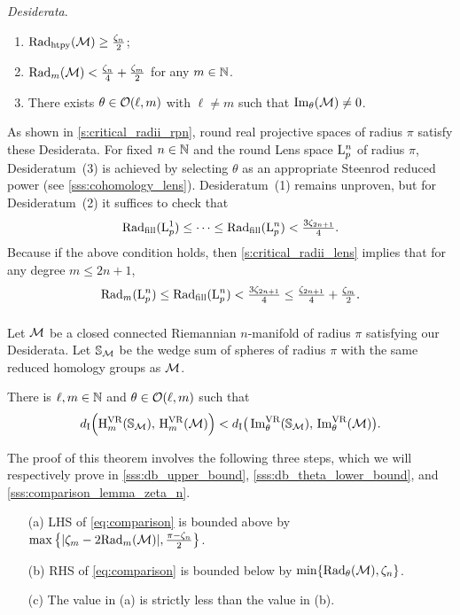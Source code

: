 \medskip\noindent\textit{\darkblue Desiderata}.\
\begin{enumerate}
    \item $\mathrm{Rad}_{\mathrm{htpy}}(\mathcal{M}) \geq \tfrac{\zeta_n}{2} $;
    \item $\mathrm{Rad}_{m}(\mathcal{M}) < \tfrac{\zeta_n}{4}+\tfrac{\zeta_m}{2}$ for any $m \in \mathbb{N}$.
    \item There exists $\theta \in \mathcal{O}(\ell, m)$ with \(\ell \neq m\) such that $\operatorname{Im}_\theta(\mathcal{M}) \neq 0$.
\end{enumerate}

\medskip As shown in \cref{s:critical_radii_rpn}, round real projective spaces of radius \(\pi\) satisfy these Desiderata.
For fixed $n\in \mathbb{N}$ and the round Lens space $\mathrm{L}^n_p$ of radius \(\pi\), Desideratum~(3) is achieved by selecting $\theta$ as an appropriate Steenrod reduced power (see \cref{sss:cohomology_lens}).
Desideratum~(1) remains unproven, but for Desideratum~(2) it suffices to check that
\[
\mathrm{Rad}_{\mathrm{fill}}(\mathrm{L}^1_p) \leq \dotsb \leq \mathrm{Rad}_{\mathrm{fill}}(\mathrm{L}^n_p) < \tfrac{3\zeta_{2n+1}}{4}.
\]
Because if the above condition holds, then \cref{s:critical_radii_lens} implies that for any degree $m \leq 2n+1$,
\[
\mathrm{Rad}_{m}(\mathrm{L}^n_p) \leq \mathrm{Rad}_{\mathrm{fill}}(\mathrm{L}^n_p) < \tfrac{3\zeta_{2n+1}}{4} \leq \tfrac{\zeta_{2n+1}}{4} + \tfrac{\zeta_{m}}{2}.
\]

\subsubsection{}\label{sss:choice of S_M}

Let \(\mathcal{M}\) be a closed connected Riemannian \(n\)-manifold of radius \(\pi\) satisfying our Desiderata.
Let $\mathbb{S}_{\mathcal{M}}$ be the wedge sum of spheres of radius \(\pi\) with the same reduced homology groups as $\mathcal{M}$.

\theorem
There is $\ell, m \in \mathbb{N}$ and $\theta \in \mathcal{O}(\ell, m)$ such that
\begin{equation}\label{eq:comparison}
    d_{\mathrm{I}} \Big(\mathrm{H}^{\mathrm{VR}}_{m}(\mathbb{S}_{\mathcal{M}}),\, \mathrm{H}^{\mathrm{VR}}_{m}(\mathcal{M})\Big) < d_{\mathrm{I}} \big(\operatorname{Im}^{\mathrm{VR}}_{\theta}(\mathbb{S}_{\mathcal{M}}),\, \operatorname{Im}^{\mathrm{VR}}_{\theta}(\mathcal{M})\big).
\end{equation}

The proof of this theorem involves the following three steps, which we will respectively prove in \cref{sss:db_upper_bound}, \cref{sss:db_theta_lower_bound}, and \cref{sss:comparison_lemma_zeta_n}.
\begin{enumerate}
    \item [(a)] LHS of \cref{eq:comparison} is bounded above by $\max\big\{|\zeta_m  - 2\mathrm{Rad}_{m}(\mathcal{M}) |, \tfrac{\pi - \zeta_n}{2}\big\}$.
    \item [(b)] RHS of \cref{eq:comparison} is bounded below by $\min\{\mathrm{Rad}_{\theta}(\mathcal{M}), \zeta_n\}$.
    \item [(c)] The value in (a) is strictly less than the value in (b).
\end{enumerate}

